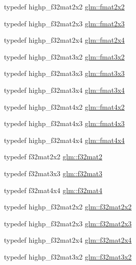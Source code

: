 \begin{DoxyCompactItemize}
typedef highp\+\_\+f32mat2x2 \hyperlink{group__gtc__type__precision_ga20fdbcc6b16bed27ad25db9b71d09e93}{glm\+::fmat2x2}
\item 
typedef highp\+\_\+f32mat2x3 \hyperlink{group__gtc__type__precision_ga80f463bcb7e5008c11af5fdbc52c0045}{glm\+::fmat2x3}
\item 
typedef highp\+\_\+f32mat2x4 \hyperlink{group__gtc__type__precision_ga76578ee3c2d6de9b46d0efd1c7060b85}{glm\+::fmat2x4}
\item 
typedef highp\+\_\+f32mat3x2 \hyperlink{group__gtc__type__precision_gab194ac1a68dbcb228384112ebe531c67}{glm\+::fmat3x2}
\item 
typedef highp\+\_\+f32mat3x3 \hyperlink{group__gtc__type__precision_ga577209f19554f5291cc3d66dda9a4388}{glm\+::fmat3x3}
\item 
typedef highp\+\_\+f32mat3x4 \hyperlink{group__gtc__type__precision_gad68d9daa91ef05b29e80e044931837cf}{glm\+::fmat3x4}
\item 
typedef highp\+\_\+f32mat4x2 \hyperlink{group__gtc__type__precision_ga9325d382b334066a4c90a814c9040359}{glm\+::fmat4x2}
\item 
typedef highp\+\_\+f32mat4x3 \hyperlink{group__gtc__type__precision_ga89195b7b13a41b0f1d34a962d1f66bfb}{glm\+::fmat4x3}
\item 
typedef highp\+\_\+f32mat4x4 \hyperlink{group__gtc__type__precision_ga16b508b75c7213ba6b24055ff3b7503d}{glm\+::fmat4x4}
\item 
typedef f32mat2x2 \hyperlink{group__gtc__type__precision_ga29b40a1141234160a627a540eceedd31}{glm\+::f32mat2}
\item 
typedef f32mat3x3 \hyperlink{group__gtc__type__precision_ga5fbaec59b220964f59403bb362b5f93e}{glm\+::f32mat3}
\item 
typedef f32mat4x4 \hyperlink{group__gtc__type__precision_ga47bc5ddfbd368423c9b762c03ba7e77f}{glm\+::f32mat4}
\item 
typedef highp\+\_\+f32mat2x2 \hyperlink{group__gtc__type__precision_gae7ebbb68656a5fd879d536b5d8452fb1}{glm\+::f32mat2x2}
\item 
typedef highp\+\_\+f32mat2x3 \hyperlink{group__gtc__type__precision_gac4573d3d213b2bce23943caef565a211}{glm\+::f32mat2x3}
\item 
typedef highp\+\_\+f32mat2x4 \hyperlink{group__gtc__type__precision_gab0eab14575c18077fd3415539bce685a}{glm\+::f32mat2x4}
\item 
typedef highp\+\_\+f32mat3x2 \hyperlink{group__gtc__type__precision_ga61653615c76194cdf3454e6e703525e0}{glm\+::f32mat3x2}

\end{DoxyCompactItemize}
